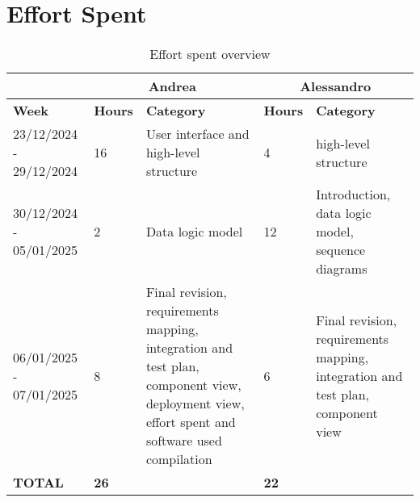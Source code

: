 \chapter{Effort Spent}
\begin{center}
	\begin{table}[H]
		\begin{tabular}{ | m{3.2cm} | m{1cm}| m{4cm} | m{1.5cm}| m{4cm} | } 
			\hline
			&  \multicolumn{2}{c|}{ Andrea} & \multicolumn{2}{c|}{ Alessandro} \\ 
			\hline
			\textbf{Week} & \textbf{Hours}   & \textbf{Category} & \textbf{Hours}       & \textbf{Category} \\
			\hline
			23/12/2024 - 29/12/2024 & 16 & User interface and high-level structure & 4 & high-level structure\\
			\hline
			30/12/2024 - 05/01/2025 & 2 & Data logic model & 12 & Introduction, data logic model, sequence diagrams\\
			\hline
			06/01/2025 - 07/01/2025 & 8 & Final revision, requirements mapping, integration and test plan, component view, deployment view, effort spent and software used compilation & 6 & Final revision, requirements mapping, integration and test plan, component view\\
			\hline
			\textbf{TOTAL} & \textbf{26} & & \textbf{22} & \\
			\hline
		\end{tabular}
		\caption{Effort spent overview}
	\end{table}
\end{center}
